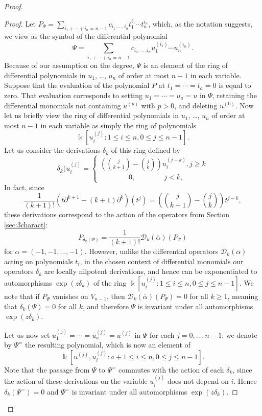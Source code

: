 \documentclass[11pt,reqno]{amsart}
\theoremstyle{plain}
\theoremstyle{definition}
\theoremstyle{remark}
\newcommand{\bk}{\Bbbk}
\newcommand{\cD}{\mathcal D}
\begin{document}
\begin{proof}
\begin{proof}
Let $P_\Psi=\sum_{i_1+\cdots+i_n=n-1}c_{i_1,\ldots,i_n}t_1^{i_1}\cdots t_n^{i_n}$, which, as the notation suggests, we view as the symbol of the differential polynomial 
 \[
\Psi=\sum_{i_1+\cdots+i_n=n-1}c_{i_1,\ldots,i_n}u_1^{(i_1)}\cdots u_n^{(i_n)}. 
 \]
Because of our assumption on the degree, $\Psi$ is an element of the ring of differential polynomials in $u_1$, \ldots, $u_n$ of order at most $n-1$ in each variable. Suppose that the evaluation of the polynomial $P$ at $t_1=\cdots=t_a=0$ is equal to zero. That evaluation corresponds to setting $u_1=\cdots=u_a=u$ in $\Psi$, retaining the differential monomials not containing $u^{(p)}$ with $p>0$, and deleting $u^{(0)}$. Now let us briefly view the ring of differential polynomials in $u_1$, \ldots, $u_n$ of order at most $n-1$ in each variable as simply the ring of polynomials 
 \[
\bk[u_i^{(j)}\colon 1\le i\le n, 0\le j\le n-1].   
 \]
Let us consider the derivations $\delta_k$ of this ring defined by 
 \[
\delta_k(u_i^{(j)}=
\begin{cases}
\left(\binom{j}{k+1}-\binom{j}{k}\right)u_i^{(j-k)}, j\ge k\\
\qquad\qquad 0, \qquad\qquad j<k,
\end{cases}
 \]
In fact, since
 \[
\frac{1}{(k+1)!}(t\partial^{k+1}-(k+1)\partial^k)(t^j)=
\left(\binom{j}{k+1}-\binom{j}{k}\right)t^{j-k},
 \]
these derivations correspond to the action of the operators from Section \ref{sec:3charact}:
 \[
P_{\delta_k(\Psi)}=\frac{1}{(k+1)!}\cD_k(\overline\alpha)(P_\Psi) 
 \]
for $\alpha=(-1,-1,\ldots,-1)$. However, unlike the differential operators $\cD_k(\overline\alpha)$ acting on polynomials $t_i$, in the chosen context of differential monomials our operators $\delta_k$ are locally nilpotent derivations, and hence can be exponentiated to automorphisms $\exp(z\delta_k)$ of the ring $\bk[u_i^{(j)}\colon 1\le i\le n, 0\le j\le n-1]$. We note that if $P_\Psi$ vanishes on $V_{n-1}$, then $\cD_k(\overline\alpha)(P_\Psi)=0$ for all $k\ge 1$, meaning that $\delta_k(\Psi)=0$ for all $k$, 
and therefore $\Psi$ is invariant under all automorphisms $\exp(z\delta_k)$. 

Let us now set $u_1^{(j)}=\cdots=u_a^{(j)}=u^{(j)}$ in $\Psi$ for each $j=0,\ldots,n-1$; we denote by $\Psi^=$ the resulting polynomial, which is now an element of 
 \[
\bk[u^{(j)}, u_i^{(j)}\colon a+1\le i\le n, 0\le j\le n-1]. 
 \]
Note that the passage from $\Psi$ to $\Psi^=$ commutes with the action of each $\delta_k$, since the action of these derivations on the variable $u_i^{(j)}$ does not depend on $i$. Hence $\delta_k(\Psi^=)=0$ and $\Psi^=$ is invariant under all automorphisms $\exp(z\delta_k)$. 


\end{proof}
\end{proof}
\end{document}

